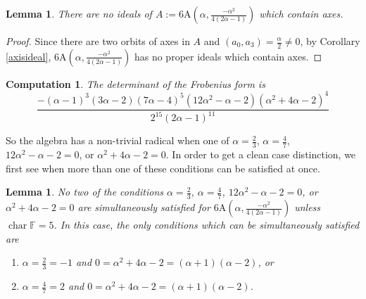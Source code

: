\documentclass[11pt, a4paper]{article}
\theoremstyle{plain}
\newtheorem{lemma}[theorem]{Lemma}
\newtheorem{computation}[theorem]{Computation}
\theoremstyle{definition}
\newcommand\al{\alpha}
\DeclareMathOperator{\ch}{char}
\newcommand\FF{\mathbb{F}}
\newcommand{\A}{\mathrm{A}}
\newcommand{\0}{\overline{0}}
\newcommand{\2}{\overline{2}}
\newcommand{\1}{\mathbbm{1}}
\begin{document}
\begin{lemma}
	There are no ideals of $A := 6\A\left(\al,\frac{-\al^2}{4(2\al-1)}\right)$ which contain axes.
\end{lemma}
\begin{proof}
Since there are two orbits of axes in $A$ and $(a_0, a_3) = \tfrac{\al}{2} \neq 0$, by Corollary \ref{axisideal}, $6\A\left(\al,\tfrac{-\al^2}{4(2\al-1)}\right)$ has no proper ideals which contain axes.
\end{proof}

\begin{computation}
The determinant of the Frobenius form is 
\[
\frac{- (\alpha - 1)^3  (3\alpha - 2)  (7\alpha - 4)^5  (12\alpha^2 - \alpha - 2)  (\alpha^2 + 4\alpha - 2)^4}{2^{15}(2\alpha - 1)^{11}}
\]
\end{computation}


So the algebra has a non-trivial radical when one of $\al = \tfrac{2}{3}$, $\al = \tfrac{4}{7}$, $12\al^2 - \al - 2 = 0$, or $\al^2 + 4\al - 2 = 0$. In order to get a clean case distinction, we first see when more than one of these conditions can be satisfied at once.

\begin{lemma}\label{6Acases}
No two of the conditions $\al = \tfrac{2}{3}$, $\al = \tfrac{4}{7}$, $12\al^2 - \al - 2 = 0$, or $\al^2 + 4\al - 2 = 0$ are simultaneously satisfied for $6\A(\al, \tfrac{-\al^2}{4(2\al-1)})$ unless $\ch \FF = 5$. In this case, the only conditions which can be simultaneously satisfied are 
\begin{enumerate}
	\item $\al = \tfrac{2}{3} = -1$ and $0 = \al^2 + 4\al - 2 =(\al +1)(\al - 2)$, or
	\item $\al = \tfrac{4}{7} = 2$ and $0 = \al^2 + 4\al - 2= (\al +1)(\al - 2)$.
\end{enumerate}
\end{lemma}
\end{document}
